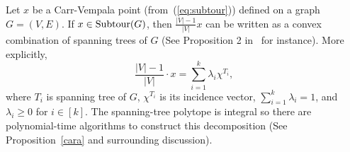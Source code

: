 Let $x$ be a Carr-Vempala point (from~(\ref{eq:subtour})) defined on a graph $G=(V,E)$. %
If $x\in \operatorname{{Subtour}}(G)$, then $\frac{|V|-1}{|V|}x$ can be written as a convex combination of spanning trees of $G$ (See Proposition 2 in~\cite{Vygen12} for instance).  More explicitly,
\begin{equation}
\label{eq:tree-decomp}
\frac{|V|-1}{|V|}\cdot x= \sum_{i=1}^{k}\lambda_i\chi^{T_i},
\end{equation}
where $T_i$ is spanning tree of $G$, $\chi^{T_i}$ is its incidence vector, $\sum_{i=1}^{k}\lambda_i=1$, and $\lambda_i\geq 0$ for $i\in [k]$. The spanning-tree polytope is integral so there are polynomial-time algorithms to construct this decomposition (See Proposition~\ref{cara} and surrounding discussion).

